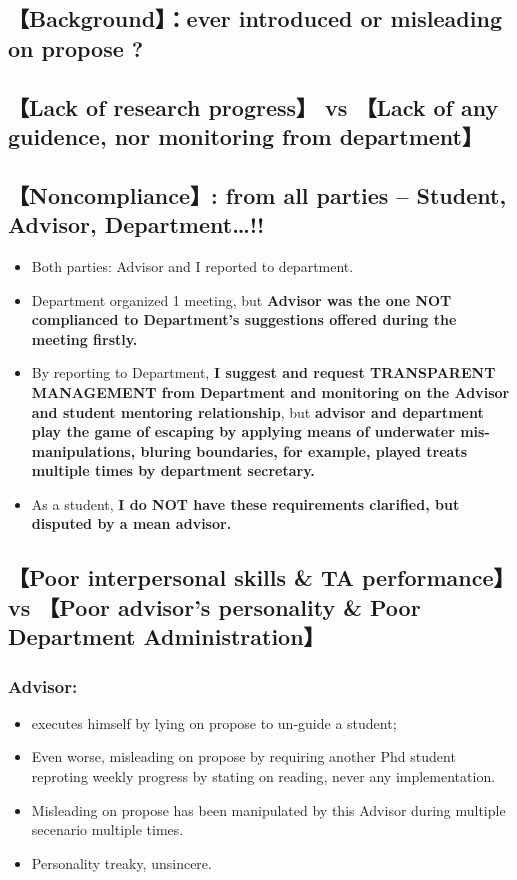 \documentclass[9pt, b5paper]{article}
\begin{document}
\subsection{【Background】：ever introduced or misleading on propose ?}
\label{sec-3-1}

\subsection{【Lack of research progress】 vs 【Lack of any guidence, nor monitoring from department】}
\label{sec-3-2}

\subsection{【Noncompliance】: from all parties -- Student, Advisor, Department\ldots{}!!}
\label{sec-3-3}
\begin{itemize}
\item Both parties: Advisor and I reported to department.
\item Department organized 1 meeting, but \textbf{Advisor was the one NOT complianced to Department's suggestions offered during the meeting firstly.}
\item By reporting to Department, \textbf{I suggest and request TRANSPARENT MANAGEMENT from Department and monitoring on the Advisor and student mentoring relationship}, but \textbf{advisor and department play the game of escaping by applying means of underwater mis-manipulations, bluring boundaries, for example, played treats multiple times by department secretary.}
\item As a student, \textbf{I do NOT have these requirements clarified, but disputed by a mean advisor.}
\end{itemize}

\subsection{【Poor interpersonal skills \& TA performance】vs 【Poor advisor's personality \& Poor Department Administration】}
\label{sec-3-4}
\subsubsection{Advisor:}
\label{sec-3-4-1}
\begin{itemize}
\item executes himself by lying on propose to un-guide a student;
\item Even worse, misleading on propose by requiring another Phd student reproting weekly progress by stating on reading, never any implementation.
\item Misleading on propose has been manipulated by this Advisor during multiple secenario multiple times.
\item Personality treaky, unsincere.
\end{itemize}
\end{document}
